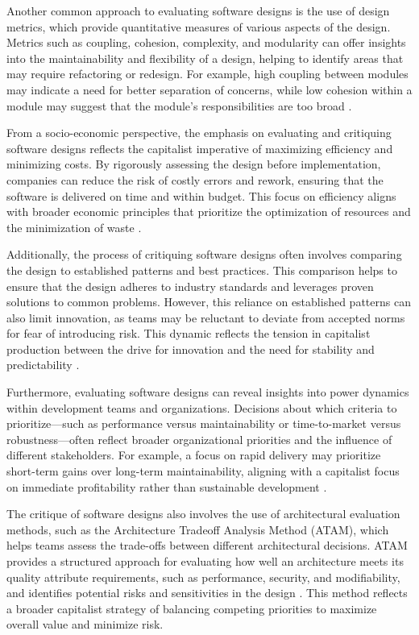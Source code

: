 \begin{refsection}
Another common approach to evaluating software designs is the use of design metrics, which provide quantitative measures of various aspects of the design. Metrics such as coupling, cohesion, complexity, and modularity can offer insights into the maintainability and flexibility of a design, helping to identify areas that may require refactoring or redesign. For example, high coupling between modules may indicate a need for better separation of concerns, while low cohesion within a module may suggest that the module’s responsibilities are too broad \cite[pp.~85-88]{Pressman2019}.

From a socio-economic perspective, the emphasis on evaluating and critiquing software designs reflects the capitalist imperative of maximizing efficiency and minimizing costs. By rigorously assessing the design before implementation, companies can reduce the risk of costly errors and rework, ensuring that the software is delivered on time and within budget. This focus on efficiency aligns with broader economic principles that prioritize the optimization of resources and the minimization of waste \cite[pp.~95-97]{Fowler2015}.

Additionally, the process of critiquing software designs often involves comparing the design to established patterns and best practices. This comparison helps to ensure that the design adheres to industry standards and leverages proven solutions to common problems. However, this reliance on established patterns can also limit innovation, as teams may be reluctant to deviate from accepted norms for fear of introducing risk. This dynamic reflects the tension in capitalist production between the drive for innovation and the need for stability and predictability \cite[pp.~150-153]{Bass2021}.

Furthermore, evaluating software designs can reveal insights into power dynamics within development teams and organizations. Decisions about which criteria to prioritize—such as performance versus maintainability or time-to-market versus robustness—often reflect broader organizational priorities and the influence of different stakeholders. For example, a focus on rapid delivery may prioritize short-term gains over long-term maintainability, aligning with a capitalist focus on immediate profitability rather than sustainable development \cite[pp.~85-88]{Pressman2019}.

The critique of software designs also involves the use of architectural evaluation methods, such as the Architecture Tradeoff Analysis Method (ATAM), which helps teams assess the trade-offs between different architectural decisions. ATAM provides a structured approach for evaluating how well an architecture meets its quality attribute requirements, such as performance, security, and modifiability, and identifies potential risks and sensitivities in the design \cite[pp.~115-118]{Bass2021}. This method reflects a broader capitalist strategy of balancing competing priorities to maximize overall value and minimize risk.


\end{refsection}
